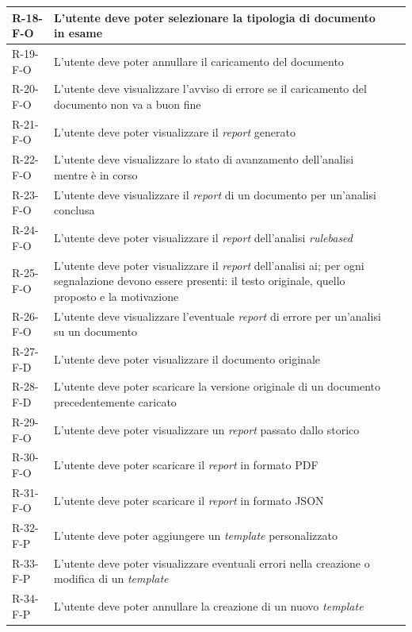 \begin{longtable}{L{2cm} L{6.4cm} L{3cm}}
\hline
R-18-F-O & L'utente deve poter selezionare la tipologia di documento in esame &  \\
\hline
R-19-F-O & L'utente deve poter annullare il caricamento del documento &  \\
\hline
R-20-F-O & L'utente deve visualizzare l'avviso di errore se il caricamento del documento non va a buon fine &  \\
\hline
R-21-F-O & L'utente deve poter visualizzare il \emph{report} generato &  \\
\hline
R-22-F-O & L'utente deve visualizzare lo stato di avanzamento dell'analisi mentre è in corso &  \\
\hline
R-23-F-O & L'utente deve visualizzare il \emph{report} di un documento per un'analisi conclusa &  \\
\hline
R-24-F-O & L'utente deve poter visualizzare il \emph{report} dell'analisi \emph{\gls{rulebased}} &  \\
\hline
R-25-F-O & L'utente deve poter visualizzare il \emph{report} dell'analisi \gls{ai}; per ogni segnalazione devono essere presenti: il testo originale, quello proposto e la motivazione &  \\
\hline
R-26-F-O & L'utente deve visualizzare l'eventuale \emph{report} di errore per un'analisi su un documento &  \\
\hline
R-27-F-D & L'utente deve poter visualizzare il documento originale &  \\
\hline
R-28-F-D & L'utente deve poter scaricare la versione originale di un documento precedentemente caricato &  \\
\hline
R-29-F-O & L'utente deve poter visualizzare un \emph{report} passato dallo storico &  \\
\hline
R-30-F-O & L'utente deve poter scaricare il \emph{report} in formato PDF &  \\
\hline
R-31-F-O & L'utente deve poter scaricare il \emph{report} in formato JSON &  \\
\hline
R-32-F-P & L'utente deve poter aggiungere un \emph{template} personalizzato &  \\
\hline
R-33-F-P & L'utente deve poter visualizzare eventuali errori nella creazione o modifica di un \emph{template} &  \\
\hline
R-34-F-P & L'utente deve poter annullare la creazione di un nuovo \emph{template} &  \\

\end{longtable}
